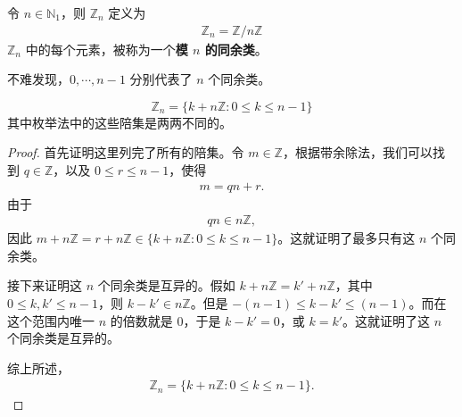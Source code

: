 \documentclass[../../main.tex]{subfiles}
\begin{document}
\begin{definition}[模 $n$ 的同余类]
令 $n\in \mathbb{N}_1$，则 $\mathbb{Z}_n$ 定义为
\begin{align*}
\mathbb{Z}_n=\mathbb{Z}/n\mathbb{Z}
\end{align*}
$\mathbb{Z}_n$ 中的每个元素，被称为一个\textbf{模 $n$ 的同余类}。
\end{definition}
\begin{note}
不难发现，$0,\cdots,n - 1$ 分别代表了 $n$ 个同余类。
\end{note}

\begin{proposition}
\[
\mathbb{Z}_n = \{k + n\mathbb{Z} : 0\leqslant k\leqslant n - 1\}
\]
其中枚举法中的这些陪集是两两不同的。
\end{proposition}
\begin{proof}
首先证明这里列完了所有的陪集。令 $m\in\mathbb{Z}$，根据带余除法，我们可以找到 $q\in\mathbb{Z}$，以及 $0\leqslant r\leqslant n - 1$，使得
\begin{align*}
m = qn + r .
\end{align*}
由于
\begin{align*}
qn\in n\mathbb{Z},
\end{align*}
因此 $m + n\mathbb{Z}=r + n\mathbb{Z}\in\{k + n\mathbb{Z} : 0\leqslant k\leqslant n - 1\}$。这就证明了最多只有这 $n$ 个同余类。

接下来证明这 $n$ 个同余类是互异的。假如 $k + n\mathbb{Z}=k' + n\mathbb{Z}$，其中 $0\leqslant k,k'\leqslant n - 1$，则 $k - k'\in n\mathbb{Z}$。但是 $-(n - 1)\leqslant k - k'\leqslant (n - 1)$。而在这个范围内唯一 $n$ 的倍数就是 $0$，于是 $k - k' = 0$，或 $k = k'$。这就证明了这 $n$ 个同余类是互异的。

综上所述，
\begin{align*}
\mathbb{Z}_n = \{k + n\mathbb{Z} : 0\leqslant k\leqslant n - 1\}.
\end{align*} 
\end{proof}
\end{document}
